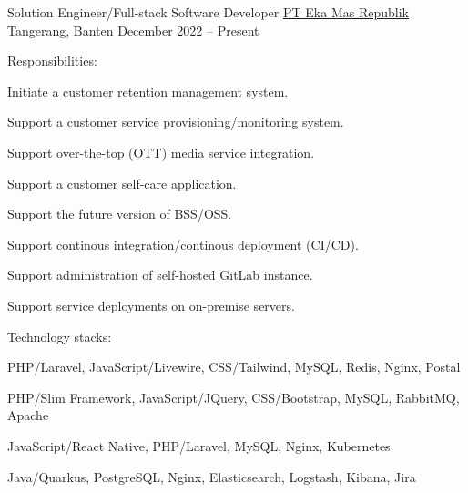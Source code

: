 


\begin{cventries}


\cventry
{Solution Engineer/Full-stack Software Developer} %
{\href{https://myrepublic.co.id/}{PT Eka Mas Republik}} %
{Tangerang, Banten} %
{December 2022 -- Present} %
{ %
Responsibilities:
\vspace{5mm}
\begin{cvitems}
\item {Initiate a customer retention management system.}
\item {Support a customer service provisioning/monitoring system.}
\item {Support over-the-top (OTT) media service integration.}
\item {Support a customer self-care application.}
\item {Support the future version of BSS/OSS.}
\item {Support continous integration/continous deployment (CI/CD).}
\item {Support administration of self-hosted GitLab instance.}
\item {Support service deployments on on-premise servers.}
\end{cvitems}
\vspace{5mm}
Technology stacks:
\vspace{5mm}
\begin{cvitems}
\item {PHP/Laravel, JavaScript/Livewire, CSS/Tailwind, MySQL, Redis, Nginx, Postal}
\item {PHP/Slim Framework, JavaScript/JQuery, CSS/Bootstrap, MySQL, RabbitMQ, Apache}
\item {JavaScript/React Native, PHP/Laravel, MySQL, Nginx, Kubernetes}
\item {Java/Quarkus, PostgreSQL, Nginx, Elasticsearch, Logstash, Kibana, Jira}
\end{cvitems}
}


\end{cventries}
